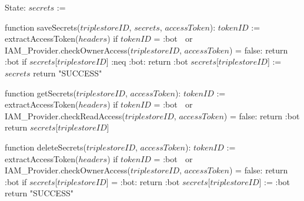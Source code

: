 State:
    $secrets$ := {}

function saveSecrets($triplestoreID$, $secrets$, $accessToken$):
    $tokenID$ := extractAccessToken($headers$)
    if $tokenID$ = :bot $\;$ or IAM_Provider.checkOwnerAccess($triplestoreID$, $accessToken$) = false:
        return :bot
    if $secrets$[$triplestoreID$] :neq :bot:
        return :bot
    $secrets$[$triplestoreID$] := $secrets$
    return "SUCCESS"

function getSecrets($triplestoreID$, $accessToken$):
    $tokenID$ := extractAccessToken($headers$)
    if $tokenID$ = :bot $\;$ or IAM_Provider.checkReadAccess($triplestoreID$, $accessToken$) = false:
        return :bot
    return $secrets$[$triplestoreID$]

function deleteSecrets($triplestoreID$, $accessToken$):
    $tokenID$ := extractAccessToken($headers$)
    if $tokenID$ = :bot $\;$ or IAM_Provider.checkOwnerAccess($triplestoreID$, $accessToken$) = false:
        return :bot
    if $secrets$[$triplestoreID$] = :bot:
        return :bot
    $secrets$[$triplestoreID$] := :bot
    return "SUCCESS"